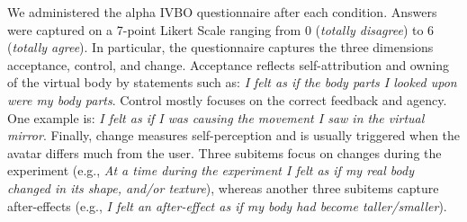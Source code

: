 We administered the alpha IVBO questionnaire after each condition. Answers were captured on a 7-point Likert Scale ranging from 0 (\textit{totally disagree}) to 6 (\textit{totally agree}). In particular, the questionnaire captures the three dimensions acceptance, control, and change. Acceptance reflects self-attribution and owning of the virtual body by statements such as: \textit{I felt as if the body parts I looked upon were my body parts}. Control mostly focuses on the correct feedback and agency. One example is: \textit{I felt as if I was causing the movement I saw in the virtual mirror}. Finally, change measures self-perception and is usually triggered when the avatar differs much from the user. Three subitems focus on changes during the experiment (e.g., \textit{At a time during the experiment I felt as if my real body changed in its shape, and/or texture}), whereas another three subitems capture after-effects (e.g., \textit{I felt an after-effect as if my body had become taller/smaller}).





%
%
%
%


